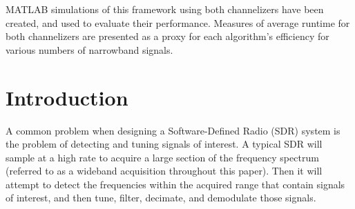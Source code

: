 \documentclass[12pt]{article}
\begin{document}
MATLAB simulations of this framework using both channelizers have been created,
and used to evaluate their performance. Measures of average runtime for both
channelizers are presented as a proxy for each algorithm's efficiency for
various numbers of narrowband signals.


\vfill



\pagebreak

%
%

\tableofcontents
\pagebreak

\listoffigures
\pagebreak


\pagestyle{myheadings}

\section{Introduction}
\label{sec:intro}

A common problem when designing a Software-Defined Radio (SDR) system is the
problem of detecting and tuning signals of interest. A typical SDR will sample
at a high rate to acquire a large section of the frequency spectrum (referred
to as a wideband acquisition throughout this paper). Then it will attempt to
detect the frequencies within the acquired range that contain signals of
interest, and then tune, filter, decimate, and demodulate those signals. 
\end{document}
